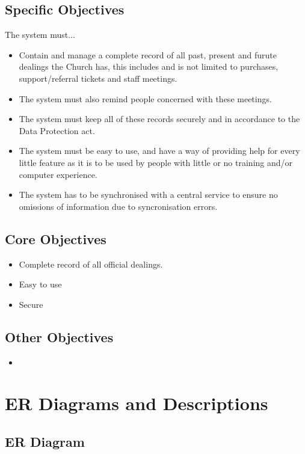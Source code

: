 \subsection{Specific Objectives}
	The system must...
	\begin{itemize}
		\item Contain and manage a complete record of all past, present and furute dealings the Church has, this includes and is not limited to purchases, support/referral tickets and staff meetings.
		\item The system must also remind people concerned with these meetings.
		\item The system must keep all of these records securely and in accordance to the Data Protection act.
		\item The system must be easy to use, and have a way of providing help for every little feature as it is to be used by people with little or no training and/or computer experience.
		\item The system has to be synchronised with a central service to ensure no omissions of information due to syncronisation errors.
	\end{itemize}

\subsection{Core Objectives}
	\begin{itemize}
		\item Complete record of all official dealings.
		\item Easy to use
		\item Secure
	\end{itemize}

\subsection{Other Objectives}
	\begin{itemize}
		\item
	\end{itemize}

\section{ER Diagrams and Descriptions}

\subsection{ER Diagram}

